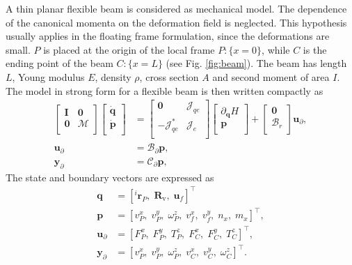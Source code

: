 A thin planar flexible beam is considered as mechanical model. The dependence of the canonical momenta on the deformation field is neglected. This hypothesis usually applies in the floating frame formulation, since the deformations are small. $P$ is placed at the origin of the local frame $P:\{x=0\}$, while $C$ is the ending point of the beam $C:\{x=L\}$ (see Fig. \ref{fig:beam}). The beam has length $L$, Young modulus $E$, density $\rho$, cross section $A$ and second moment of area $I$. The model in strong form for a flexible beam is then written compactly as 
\begin{equation}
\label{eq:EB_str_phdae}
\begin{aligned}
\begin{bmatrix}
\bm{I} & \bm{0} \\
\bm{0} & \mathcal{M} \\
\end{bmatrix}
\begin{bmatrix}
\dot{\bm{q}} \\
\dot{\bm{p}} \\
\end{bmatrix}
&= \begin{bmatrix}
\bm{0} & {\mathcal{J}}_{qe} \\
-{\mathcal{J}}_{qe}^* & {\mathcal{J}}_e \\
\end{bmatrix}
\begin{bmatrix}
\partial_{\bm{q}} H \\
\bm{p}  \\
\end{bmatrix} + 
\begin{bmatrix}
\bm{0} \\
{\mathcal{B}}_r \\
\end{bmatrix} \bm{u}_\partial, \\
\bm{u}_\partial &= {\mathcal{B}}_{\partial} \bm{p}, \\
\bm{y}_\partial &= {\mathcal{C}}_{\partial} \bm{p},
\end{aligned}
\end{equation}
The state and boundary vectors are expressed as
\begin{align*}
\bm{q} &= [^i\bm{r}_P, \; \bm{R}_{\text{v}}, \; \bm{u}_f]^\top \\
\bm{p} &= [v_P^x, \; v_P^y, \; \omega_P^z, \; v_f^x, \; v_f^y, \; n_x, \; m_{x}]^\top, \\
\bm{u}_\partial &=  [F_{P}^x, \; F_{P}^y, \; T_{P}^z, \; F_{C}^x, \; F_{C}^y, \; T_{C}^z]^\top, \\
\bm{y}_\partial &=  [v_{P}^x, \; v_{P}^y, \; \omega_{P}^z, \; v_{C}^x, \; v_{C}^y, \; \omega_{C}^z]^\top.
\end{align*}
